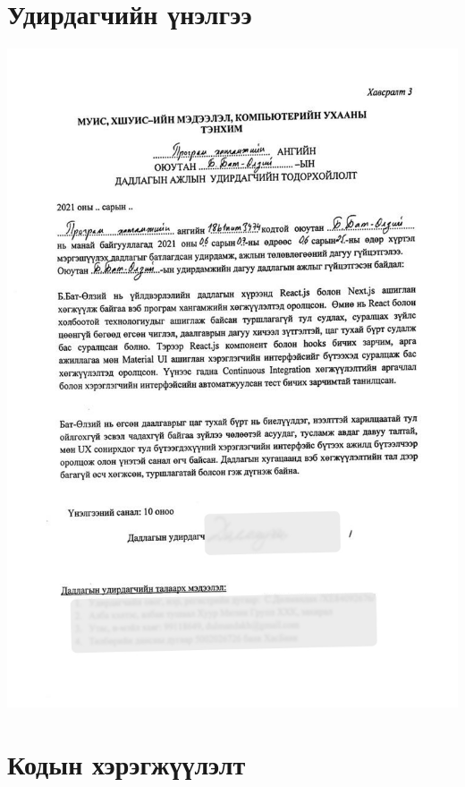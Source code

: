 
\appendix
{}

\chapter{Удирдагчийн үнэлгээ}
\includegraphics[width=14cm]{images/review.jpg}
\chapter{Кодын хэрэгжүүлэлт}

